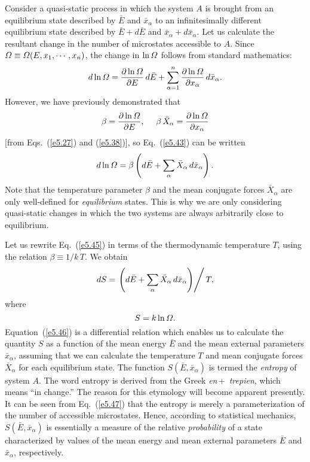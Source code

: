 Consider a quasi-static process in which the system $A$ is brought from an equilibrium
state described by $\bar{E}$ and $\bar{x}_\alpha$ to an infinitesimally different
equilibrium state described by $\bar{E}+d\bar{E}$ and 
$\bar{x}_\alpha + d\bar{x}_\alpha$. Let us calculate the resultant change in the
number of microstates accessible to $A$. Since ${\mit\Omega}\equiv {\mit\Omega}(E, x_1,\cdots,
x_n)$, the change in $\ln{\mit\Omega}$ follows from standard mathematics:
\begin{equation}\label{e5.43}
d \ln {\mit\Omega} = \frac{\partial \ln {\mit\Omega}}{\partial E}\,d\bar{E}+
\sum_{\alpha=1}^n\frac{\partial \ln {\mit\Omega}}{\partial x_\alpha}\,d\bar{x}_\alpha.
\end{equation}
However, we have previously demonstrated that
\begin{equation}
\beta = \frac{\partial \ln {\mit\Omega}}{\partial E},~~~~\beta\,\bar{X}_\alpha
=\frac{\partial\ln {\mit\Omega}}{\partial x_\alpha}
\end{equation}
[from Eqs.~(\ref{e5.27}) and (\ref{e5.38})],
so Eq.~(\ref{e5.43}) can be written
\begin{equation}\label{e5.45}
d\ln{\mit\Omega} = \beta\left(d\bar{E} + \sum_\alpha \bar{X}_\alpha\,d\bar{x}_\alpha
\right).
\end{equation}
Note that the temperature parameter $\beta$ and the mean conjugate forces 
$\bar{X}_\alpha$ are only well-defined for {\em equilibrium}\/ states. This is
why we are only considering quasi-static changes
 in which  the two systems are always
arbitrarily close to equilibrium.
	
	Let us rewrite Eq.~(\ref{e5.45}) 
in terms of the thermodynamic temperature $T$,
using the relation $\beta\equiv 1/k\,T$. We obtain
\begin{equation}\label{e5.46}
d S = \left.\left(d\bar{E} +\sum_\alpha \bar{X}_\alpha\,d\bar{x}_\alpha\right)\right/T,
\end{equation}
where
\begin{equation}
S = k\ln{\mit\Omega}.\label{e5.47}
\end{equation}
Equation~(\ref{e5.46}) is a differential relation which enables us to calculate
the quantity
$S$ as a function of the mean energy $\bar{E}$ and the mean external parameters
$\bar{x}_\alpha$, assuming that we can calculate the temperature $T$ and mean 
conjugate forces $\bar{X}_\alpha$ for each equilibrium state. The function
$S(\bar{E}, \bar{x}_\alpha)$ is termed the {\em entropy}\/ of system $A$. The word
entropy is derived from the Greek {\em en}\,+\,{\em 
trepien}, which means ``in change.''\@ 
The reason for this etymology 
will become apparent presently. It can be seen from Eq.~(\ref{e5.47})
that the entropy is merely a parameterization 
of the number of accessible microstates.
Hence, according to statistical mechanics, $S(\bar{E}, \bar{x}_\alpha)$ is essentially
 a measure of the relative {\em probability}\/ 
of a state characterized by values of the mean energy and mean external parameters
$\bar{E}$ and $\bar{x}_\alpha$, respectively.


